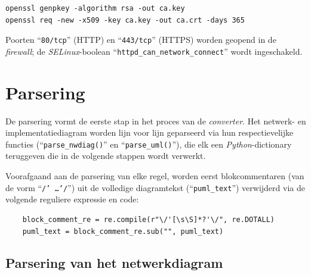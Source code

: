 \begin{codeblockfixed}
  \begin{codeblock}
    \begin{lstlisting}
openssl genpkey -algorithm rsa -out ca.key
openssl req -new -x509 -key ca.key -out ca.crt -days 365
\end{lstlisting}
    \caption[Generatie private key en self-signed certificate met ``\texttt{openssl}'']{Proces om een private key en self-signed certificate te creëren via ``\texttt{openssl}''.}
    \label{code:webserver_openssl}
  \end{codeblock}
\end{codeblockfixed}

Poorten ``\texttt{80/tcp}'' (HTTP) en ``\texttt{443/tcp}'' (HTTPS) worden geopend in de \emph{firewall}; de \emph{SELinux}-boolean ``\texttt{httpd\_can\_network\_connect}'' wordt ingeschakeld.

\section{Parsering}%
\label{sec:parsering}

De parsering vormt de eerste stap in het proces van de \emph{converter}. Het netwerk- en implementatiediagram worden lijn voor lijn geparseerd via hun respectievelijke functies (``\texttt{parse\_nwdiag()}'' en ``\texttt{parse\_uml()}''), die elk een \emph{Python}-dictionary teruggeven die in de volgende stappen wordt verwerkt.

Voorafgaand aan de parsering van elke regel, worden eerst blokcommentaren (van de vorm ``\texttt{/' \ldots '/}'') uit de volledige diagramtekst (``\texttt{puml\_text}'') verwijderd via de volgende reguliere expressie en code:

\begin{codeblockfixed}
  \begin{codeblock}
    \begin{verbatim}
    block_comment_re = re.compile(r"\/'[\s\S]*?'\/", re.DOTALL)
    puml_text = block_comment_re.sub("", puml_text)
\end{verbatim}
    \caption[Verwijdering van blokcommentaren]{Reguliere expressie en code voor het verwijderen van blokcommentaren.}
    \label{code:regex_block_comment}
  \end{codeblock}
\end{codeblockfixed}

\subsection{Parsering van het netwerkdiagram}%
\label{subsec:parsering_nwdiag}

